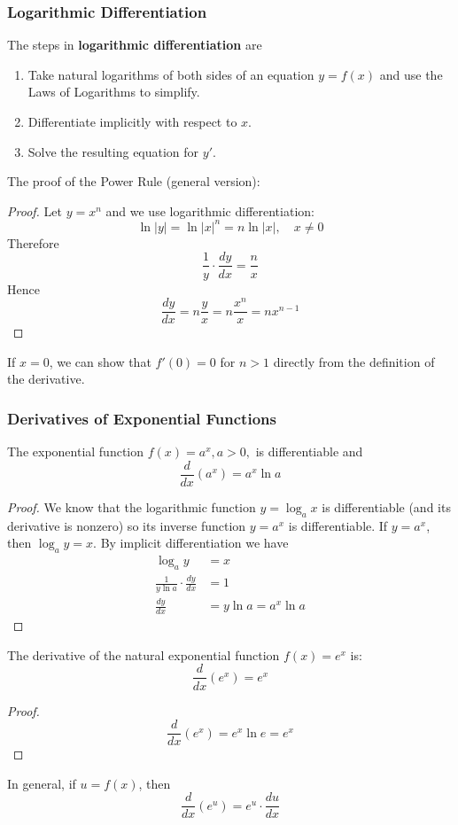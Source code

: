 \subsubsection*{Logarithmic Differentiation}
The steps in \textbf{logarithmic differentiation} are
\begin{enumerate}
    \item Take natural logarithms of both sides of an equation \(y=f(x)\) and
    use the Laws of Logarithms to simplify.
    \item Differentiate implicitly with respect to \(x\).
    \item Solve the resulting equation for \(y'\).
\end{enumerate}
The proof of the Power Rule (general version):
\begin{proof}
    Let \(y=x^n\) and we use logarithmic differentiation:
    \[\ln|y|=\ln|x|^n=n\ln|x|,\quad x\neq 0\]
    Therefore
    \[\frac{1}{y}\cdot\frac{dy}{dx}=\frac{n}{x}\]
    Hence
    \[\frac{dy}{dx}=n\frac{y}{x}=n\frac{x^n}{x}=nx^{n-1}\]
\end{proof}
If \(x=0\), we can show that \(f'(0)=0\) for \(n>1\) directly from the
definition of the derivative.

\subsubsection*{Derivatives of Exponential Functions}
\begin{theorem}
    The exponential function \(f(x)=a^x,a>0,\) is differentiable and
    \[\frac{d}{dx}(a^x)=a^x\ln a\]
\end{theorem}
\begin{proof}
    We know that the logarithmic function \(y=\log_a x\) is differentiable
    (and its derivative is nonzero) so its inverse function \(y=a^x\) is
    differentiable.
    If \(y=a^x\), then \(\log_a y=x\).
    By implicit differentiation we have
    \begin{align*}
        \log_a y &= x \\
        \frac{1}{y\ln a}\cdot\frac{dy}{dx} &= 1 \\
        \frac{dy}{dx} &= y\ln a=a^x\ln a 
    \end{align*}
\end{proof}
The derivative of the natural exponential function \(f(x)=e^x\) is:
\[\frac{d}{dx}(e^x)=e^x\]
\begin{proof}
    \[\frac{d}{dx}(e^x)=e^x\ln e=e^x\]
\end{proof}
In general, if \(u=f(x)\), then
\[\frac{d}{dx}(e^u)=e^u\cdot\frac{du}{dx}\]

